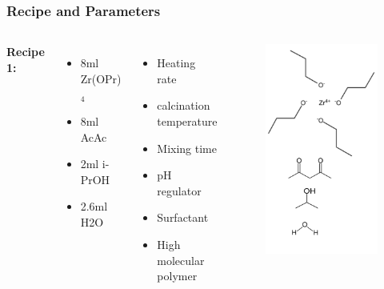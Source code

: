 \documentclass{beamer}
\begin{document}
\begin{frame}
	\frametitle{Recipe and Parameters}
	\begin{columns}[t]
			\textbf{Recipe 1:}
			\begin{itemize}
				\item 8ml Zr(OPr)$_4$
				\item 8ml AcAc 
				\item 2ml i-PrOH
				\item 2.6ml H2O
			\end{itemize}
			\begin{itemize}
				\item<2-> Heating rate 
				\item<2-> calcination temperature
				\item<2-> Mixing time
				\item<2-> pH regulator
				\item<2-> Surfactant
				\item<2-> High molecular polymer
			\end{itemize}
			\begin{figure}
				\includegraphics[height=0.8\textheight]{Images/recipe1.png}
			\end{figure}
	\end{columns}
\end{frame}
\end{document}
